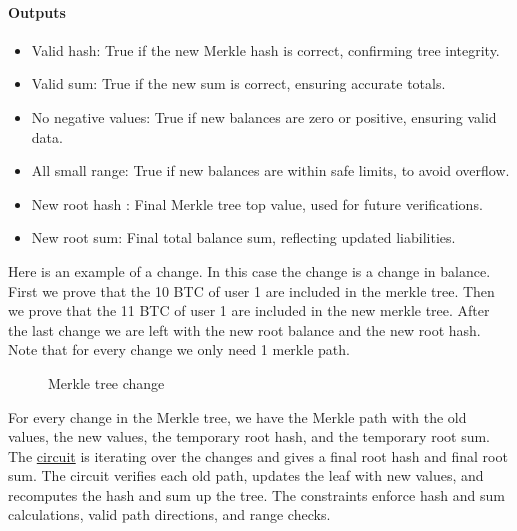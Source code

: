 \paragraph{Outputs}
\begin{itemize}
   \item Valid hash: True if the new Merkle hash is correct, confirming tree integrity.
   \item Valid sum: True if the new sum is correct, ensuring accurate totals.
   \item No negative values: True if new balances are zero or positive, ensuring valid data.
   \item All small range: True if new balances are within safe limits, to avoid overflow.
   \item New root hash : Final Merkle tree top value, used for future verifications.
   \item New root sum: Final total balance sum, reflecting updated liabilities.
   \end{itemize}

Here is an example of a change. In this case the change is a change in balance. First we prove that the 10 BTC of user 1 are
included in the merkle tree. Then we prove that the 11 BTC of user 1 are included in the new merkle tree. After the last change we are left
with the new root balance and the new root hash. Note that for every change we only need 1 merkle path.

\begin{figure}
   \hfill
   \hfill
   \hfill
   \caption{Merkle tree change}
   \end{figure}

For every change in the Merkle tree, we have the Merkle path with the old values, the new values, the temporary root hash, and the temporary root sum.
The \hyperref[subsec:plcc]{circuit} is iterating over the changes and gives a final root hash and final root sum. 
The circuit verifies each old path, updates the leaf with new values, and recomputes the hash and sum up the tree. 
The constraints enforce hash and sum calculations, valid path directions, and range checks.

